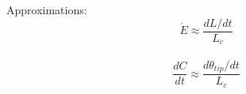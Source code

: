 \documentclass[preview, crop=True]{standalone}
\begin{document}

Approximations:\\
$$\dot{E} \approx \frac{dL/dt}{L_c}$$\\
$$\frac{dC}{dt} \approx \frac{d\theta_{tip}/dt}{L_c}$$
\end{document}
